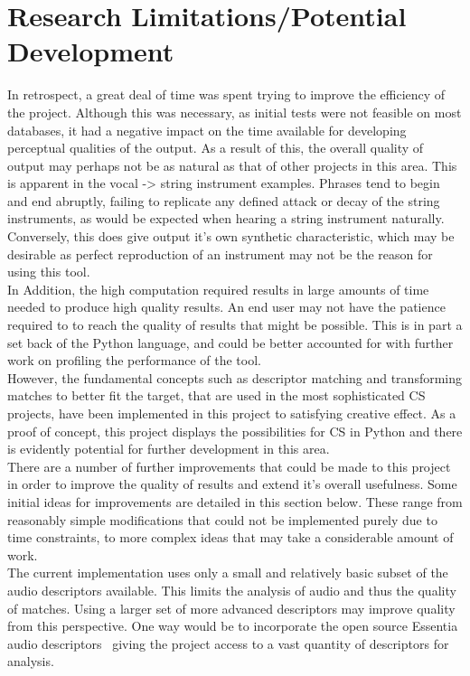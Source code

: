 \documentclass[titlepage]{scrartcl}
\begin{document}
    \section*{Research Limitations/Potential Development}
    In retrospect, a great deal of time was spent trying to improve the
    efficiency of the project. Although this was necessary, as initial tests
    were not feasible on most databases, it had a negative impact on the time
    available for developing perceptual qualities of the output. As a result of
    this, the overall quality of output may perhaps not be as natural as that of
    other projects in this area. This is apparent in the vocal -> string
    instrument examples. Phrases tend to begin and end abruptly, failing to
    replicate any defined attack or decay of the string instruments, as would
    be expected when hearing a string instrument naturally. Conversely, this
    does give output it's own synthetic characteristic, which may be desirable
    as perfect reproduction of an instrument may not be the reason for using
    this tool.\\
    In Addition, the high computation required results in large amounts of time
    needed to produce high quality results. An end user may not have the
    patience required to to reach the quality of results that might be
    possible. This is in part a set back of the Python language, and could be
    better accounted for with further work on profiling the performance of the
    tool.\\
    However, the fundamental concepts such as descriptor matching and
    transforming matches to better fit the target, that are used in the most
    sophisticated CS projects, have been implemented in this project to
    satisfying creative effect. As a proof of concept, this project displays
    the possibilities for CS in Python and there is evidently potential for
    further development in this area.\\

    There are a number of further improvements that could be made to this
    project in order to improve the quality of results and extend it's overall
    usefulness. Some initial ideas for improvements are detailed in this
    section below. These range from reasonably simple modifications that could
    not be implemented purely due to time constraints, to more complex ideas
    that may take a considerable amount of work.\\

    The current implementation uses only a small and relatively basic subset of
    the audio descriptors available. This limits the analysis of audio and thus
    the quality of matches. Using a larger set of more advanced descriptors may
    improve quality from this perspective. One way would be to incorporate the
    open source Essentia audio descriptors~\parencite{Essentia2016} giving the
    project access to a vast quantity of descriptors for analysis.\\
\end{document}
